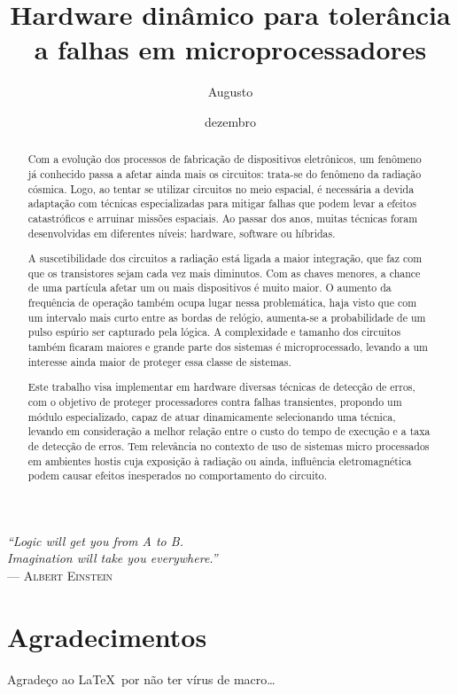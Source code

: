 \documentclass[pgmicro,diss,openright,oneside]{iiufrgs}
\title{Hardware dinâmico para tolerância a falhas em microprocessadores}
\author{Augusto}{Thiago Rider}
\date{dezembro}{2015}
\begin{document}
\maketitle

\clearpage
\begin{flushright}
\mbox{}\vfill
{\sffamily\itshape
``Logic will get you from A to B. \\
Imagination will take you everywhere.''\\}
--- \textsc{Albert Einstein}
\end{flushright}

\chapter*{Agradecimentos}
Agradeço ao \LaTeX\ por não ter vírus de macro\ldots



\begin{abstract}
Com a evolução dos processos de fabricação de dispositivos eletrônicos, um fenômeno já conhecido passa a afetar ainda mais os circuitos: trata-se do fenômeno da radiação cósmica. Logo, ao tentar se utilizar circuitos no meio espacial, é necessária a devida adaptação com técnicas especializadas para mitigar falhas que podem levar a efeitos catastróficos e arruinar missões espaciais. Ao passar dos anos, muitas técnicas foram desenvolvidas em diferentes níveis: hardware, software ou híbridas.

A suscetibilidade dos circuitos a radiação está ligada a maior integração, que faz com que os transistores sejam cada vez mais diminutos. Com as chaves menores, a chance de uma partícula afetar um ou mais dispositivos é muito maior. O aumento da frequência de operação também ocupa lugar nessa problemática, haja visto que com um intervalo mais curto entre as bordas de relógio, aumenta-se a probabilidade de um pulso espúrio ser capturado pela lógica. A complexidade e tamanho dos circuitos também ficaram maiores e grande parte dos sistemas é microprocessado, levando a um interesse ainda maior de proteger essa classe de sistemas.

Este trabalho visa implementar em hardware diversas técnicas de detecção de erros, com o objetivo de proteger processadores contra falhas transientes, propondo um  módulo especializado, capaz de atuar dinamicamente selecionando uma técnica, levando em consideração a melhor relação entre o custo do tempo de execução e a taxa de detecção de erros. Tem relevância no contexto de uso de sistemas micro processados em ambientes hostis cuja exposição à radiação ou ainda, influência eletromagnética podem causar efeitos inesperados no comportamento do circuito.
\end{abstract}
\end{document}
